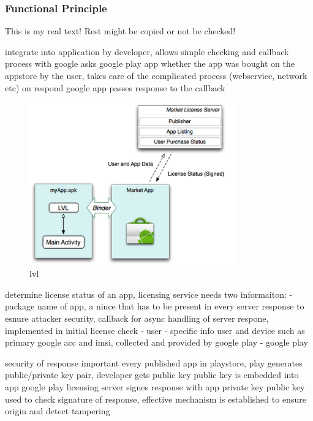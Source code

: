 \subsubsection{Functional Principle} \label{subsection:license-google-functional}
This is my real text! Rest might be copied or not be checked!

%
integrate into application by developer, allows simple checking and callback process with google
asks google play app whether the app was bought on the appstore by the user, takes care of the complicated process (webservice, network etc)
on respond google app passes response to the callback
\begin{figure}[h]
    \centering
    \includegraphics[width=0.8\textwidth]{data/lvl.png}
    \caption{lvl \cite{developersLicensing}}
    \label{fig:lvl}
\end{figure}

determine license status of an app, licensing service needs two informaiton:
- package name of app, a nince that has to be present in every server response to esnure attacker security, callback for async handling of server respone, implemented in initial license check - user
- specific info user and device such as primary google acc and imsi, collected and provided by google play - google play

security of response important
every published app in playstore, play generates public/private key pair, developer gets public key
public key is embedded into app
google play licensing server signes response with app private key
public key used to check signature of response, effective mechanism is established to ensure origin and detect tampering
\cite{munteanLicense}
%

